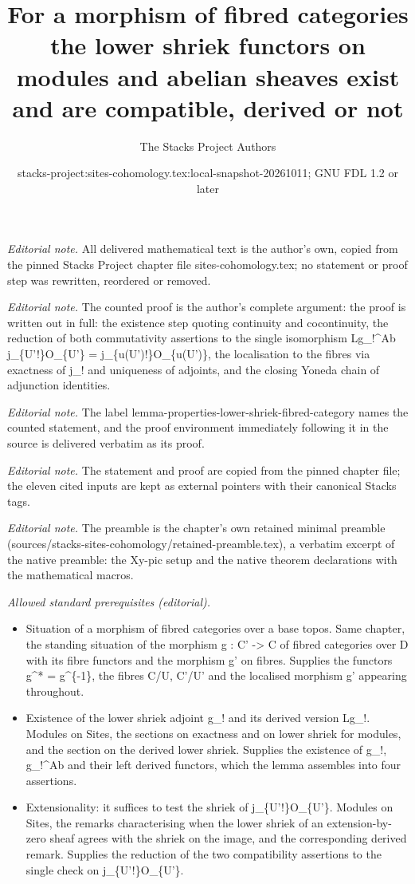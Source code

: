 \documentclass[10pt,a4paper]{amsart}
\title{For a morphism of fibred categories the lower shriek functors on modules and abelian sheaves exist and are compatible, derived or not}
\author{The Stacks Project Authors}
\date{stacks-project:sites-cohomology.tex:local-snapshot-20261011; GNU FDL 1.2 or later}
\theoremstyle{plain}
\theoremstyle{definition}
\theoremstyle{remark}
\numberwithin{equation}{subsection}
\begin{document}
\maketitle
\noindent\textit{Editorial note.} All delivered mathematical text is the author's own, copied from the pinned Stacks Project chapter file sites-cohomology.tex; no statement or proof step was rewritten, reordered or removed.\par\medskip
\noindent\textit{Editorial note.} The counted proof is the author's complete argument: the proof is written out in full: the existence step quoting continuity and cocontinuity, the reduction of both commutativity assertions to the single isomorphism Lg\_!\textasciicircum{}Ab j\_\{U'!\}O\_\{U'\} = j\_\{u(U')!\}O\_\{u(U')\}, the localisation to the fibres via exactness of j\_! and uniqueness of adjoints, and the closing Yoneda chain of adjunction identities.\par\medskip
\noindent\textit{Editorial note.} The label lemma-properties-lower-shriek-fibred-category names the counted statement, and the proof environment immediately following it in the source is delivered verbatim as its proof.\par\medskip
\noindent\textit{Editorial note.} The statement and proof are copied from the pinned chapter file; the eleven cited inputs are kept as external pointers with their canonical Stacks tags.\par\medskip
\noindent\textit{Editorial note.} The preamble is the chapter's own retained minimal preamble (sources/stacks-sites-cohomology/retained-preamble.tex), a verbatim excerpt of the native preamble: the Xy-pic setup and the native theorem declarations with the mathematical macros.\par\medskip
\noindent\textit{Allowed standard prerequisites (editorial).}\begin{itemize}
\item Situation of a morphism of fibred categories over a base topos. Same chapter, the standing situation of the morphism g : C' -> C of fibred categories over D with its fibre functors and the morphism g' on fibres. Supplies the functors g\textasciicircum{}* = g\textasciicircum{}\{-1\}, the fibres C/U, C'/U' and the localised morphism g' appearing throughout.
\item Existence of the lower shriek adjoint g\_! and its derived version Lg\_!. Modules on Sites, the sections on exactness and on lower shriek for modules, and the section on the derived lower shriek. Supplies the existence of g\_!, g\_!\textasciicircum{}Ab and their left derived functors, which the lemma assembles into four assertions.
\item Extensionality: it suffices to test the shriek of j\_\{U'!\}O\_\{U'\}. Modules on Sites, the remarks characterising when the lower shriek of an extension-by-zero sheaf agrees with the shriek on the image, and the corresponding derived remark. Supplies the reduction of the two compatibility assertions to the single check on j\_\{U'!\}O\_\{U'\}.
\end{itemize}\medskip
\end{document}
